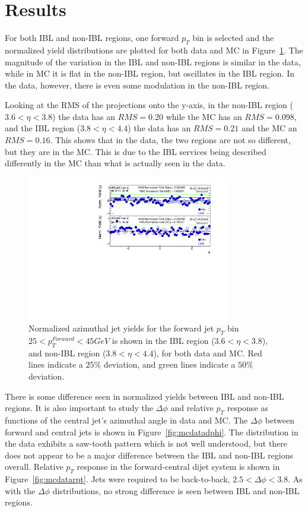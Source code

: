 \section{Results}

For both IBL and non-IBL regions, one forward $p_{T}$ bin is selected and the normalized yield distributions are plotted for both data and MC in Figure~\ref{fig:mcdata}. The magnitude of the variation in the IBL and non-IBL regions is similar in the data, while in MC it is flat in the non-IBL region, but oscillates in the IBL region. In the data, however, there is even some modulation in the non-IBL region. 

Looking at the RMS of the projections onto the y-axis, in the non-IBL region ($3.6<\eta<3.8$) the data has an $RMS=0.20$ while the MC has an $RMS=0.098$, and the IBL region ($3.8<\eta<4.4$) the data has an $RMS=0.21$ and the MC an $RMS=0.16$. This shows that in the data, the two regions are not so different, but they are in the MC. This is due to the IBL services being described differently in the MC than what is actually seen in the data. 

\begin{figure}
	\centering
	\includegraphics[width=0.8\textwidth]{figures/qualification/mcData.pdf}
	\caption{Normalized azimuthal jet yields for the forward jet $p_{T}$ bin $25<p_{T}^{Forward}<45 GeV$ is shown in the IBL region ($3.6<\eta<3.8$), and non-IBL region ($3.8<\eta<4.4$), for both data and MC. Red lines indicate a $25\%$ deviation, and green lines indicate a $50\%$ deviation.}
	\label{fig:mcdata}
\end{figure}

There is some difference seen in normalized yields between IBL and non-IBL regions. It is also important to study the $\Delta\phi$ and relative $p_{T}$ response as functions of the central jet's azimuthal angle in data and MC. The $\Delta\phi$ between forward and central jets is shown in Figure~\ref{fig:mcdatadphi}. The distribution in the data exhibits a saw-tooth pattern which is not well understood, but there does not appear to be a major difference between the IBL and non-IBL regions overall. Relative $p_{T}$ response in the forward-central dijet system is shown in Figure~\ref{fig:mcdatarpt}. Jets were required to be back-to-back, $2.5<\Delta\phi<3.8$. As with the $\Delta\phi$ distributions, no strong difference is seen between IBL and non-IBL regions. 

